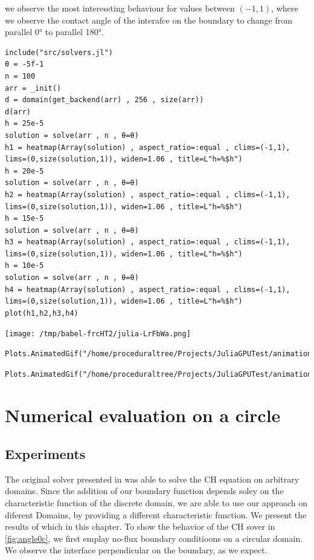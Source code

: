 \documentclass{mimosis}
\begin{document}
we observe the most interessting behaviour for values between \((-1,1)\), where we observe the contact angle of the interafce on the boundary to change from parallel 0° to parallel 180°.
\begin{verbatim}
include("src/solvers.jl")
θ = -5f-1
n = 100
arr = _init()
d = domain(get_backend(arr) , 256 , size(arr))
d(arr)
h = 25e-5
solution = solve(arr , n , θ=θ)
h1 = heatmap(Array(solution) , aspect_ratio=:equal , clims=(-1,1), lims=(0,size(solution,1)), widen=1.06 , title=L"h=%$h")
h = 20e-5
solution = solve(arr , n , θ=θ)
h2 = heatmap(Array(solution) , aspect_ratio=:equal , clims=(-1,1), lims=(0,size(solution,1)), widen=1.06 , title=L"h=%$h")
h = 15e-5
solution = solve(arr , n , θ=θ)
h3 = heatmap(Array(solution) , aspect_ratio=:equal , clims=(-1,1), lims=(0,size(solution,1)), widen=1.06 , title=L"h=%$h")
h = 10e-5
solution = solve(arr , n , θ=θ)
h4 = heatmap(Array(solution) , aspect_ratio=:equal , clims=(-1,1), lims=(0,size(solution,1)), widen=1.06 , title=L"h=%$h")
plot(h1,h2,h3,h4)
\end{verbatim}

\begin{center}
\texttt{[image: /tmp/babel-frcHT2/julia-LrFbWa.png]}
\label{fig:random-square}
\end{center}

\label{}
\begin{verbatim}
Plots.AnimatedGif("/home/proceduraltree/Projects/JuliaGPUTest/animations/h.mp4")
\end{verbatim}


\label{}
\begin{verbatim}
Plots.AnimatedGif("/home/proceduraltree/Projects/JuliaGPUTest/animations/epsilon.mp4")
\end{verbatim}
\chapter{Numerical evaluation on a circle}
\label{sec:org0841c9c}
\section{Experiments}
\label{sec:org5591fd6}
The original solver presented in\autocite{SHIN20117441}  was able to solve the CH equation on arbitrary domains. Since the addition of our boundary function depends soley on the characteristic function of the discrete domain, we are able to use our approach on diferent Domains, by providing a different characteristic function. We present the results of which in this chapter.
To show the behavior of the CH sover in \ref{fig:angle0c}, we first emplay no-flux boundary conditioons on a circular domain. We observe the interface perpendicular on the boundary, as we expect.
\end{document}
